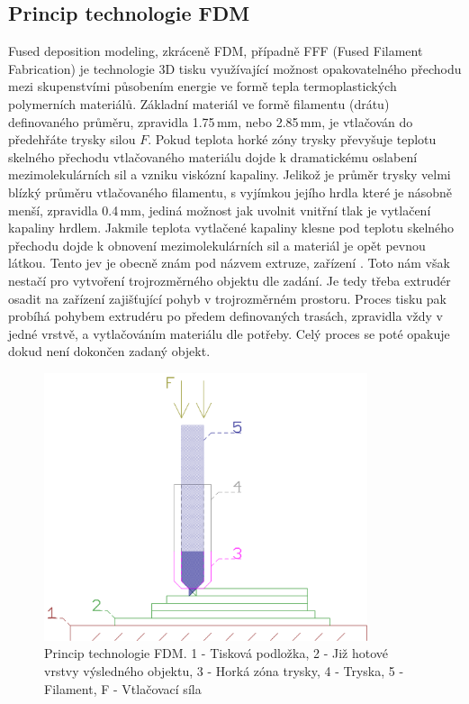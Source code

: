 \subsection{Princip technologie FDM}
Fused deposition modeling, zkráceně FDM, případně FFF (Fused Filament Fabrication) je technologie 3D tisku využívající možnost opakovatelného přechodu mezi skupenstvími působením energie ve formě tepla termoplastických polymerních materiálů. Základní materiál ve formě filamentu (drátu) definovaného průměru, zpravidla 1.75\,mm, nebo 2.85\,mm, je vtlačován do předehřáte trysky silou $F$. Pokud teplota horké zóny trysky převyšuje teplotu skelného přechodu vtlačovaného materiálu dojde k dramatickému oslabení mezimolekulárních sil a vzniku viskózní kapaliny. Jelikož je průměr trysky velmi blízký průměru vtlačovaného filamentu, s vyjímkou jejího hrdla které je násobně menší, zpravidla 0.4\,mm, jediná možnost jak uvolnit vnitřní tlak je vytlačení kapaliny hrdlem. Jakmile teplota vytlačené kapaliny klesne pod teplotu skelného přechodu dojde k obnovení mezimolekulárních sil a materiál je opět pevnou látkou. Tento jev je obecně znám pod názvem extruze, zařízení .
Toto nám však nestačí pro vytvoření trojrozměrného objektu dle zadání. Je tedy třeba extrudér osadit na zařízení zajišťující pohyb v trojrozměrném prostoru.
Proces tisku pak probíhá pohybem extrudéru po předem definovaných trasách, zpravidla vždy v jedné vrstvě, a vytlačováním materiálu dle potřeby. Celý proces se poté opakuje dokud není dokončen zadaný objekt.
\begin{figure}[h]
\begin{center}
\includegraphics[width=9.5cm]{pics/fdm}
\caption{Princip technologie FDM. 1 - Tisková podložka, 2 - Již hotové vrstvy výsledného objektu, 3 - Horká zóna trysky, 4 - Tryska, 5 - Filament, F - Vtlačovací síla}
\end{center}
\end{figure}


